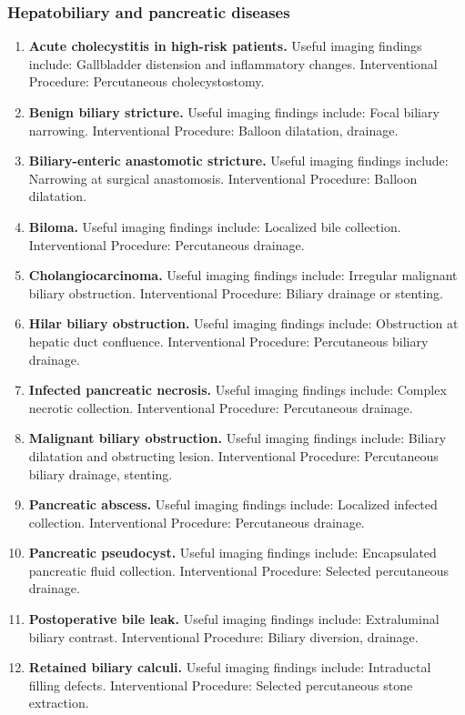 \subsubsection{Hepatobiliary and pancreatic diseases}
\begin{enumerate}[leftmargin=*,itemsep=0.45em,topsep=0.4em]
\item \textbf{Acute cholecystitis in high-risk patients.} Useful imaging findings include: Gallbladder distension and inflammatory changes. Interventional Procedure: Percutaneous cholecystostomy.
\item \textbf{Benign biliary stricture.} Useful imaging findings include: Focal biliary narrowing. Interventional Procedure: Balloon dilatation, drainage.
\item \textbf{Biliary-enteric anastomotic stricture.} Useful imaging findings include: Narrowing at surgical anastomosis. Interventional Procedure: Balloon dilatation.
\item \textbf{Biloma.} Useful imaging findings include: Localized bile collection. Interventional Procedure: Percutaneous drainage.
\item \textbf{Cholangiocarcinoma.} Useful imaging findings include: Irregular malignant biliary obstruction. Interventional Procedure: Biliary drainage or stenting.
\item \textbf{Hilar biliary obstruction.} Useful imaging findings include: Obstruction at hepatic duct confluence. Interventional Procedure: Percutaneous biliary drainage.
\item \textbf{Infected pancreatic necrosis.} Useful imaging findings include: Complex necrotic collection. Interventional Procedure: Percutaneous drainage.
\item \textbf{Malignant biliary obstruction.} Useful imaging findings include: Biliary dilatation and obstructing lesion. Interventional Procedure: Percutaneous biliary drainage, stenting.
\item \textbf{Pancreatic abscess.} Useful imaging findings include: Localized infected collection. Interventional Procedure: Percutaneous drainage.
\item \textbf{Pancreatic pseudocyst.} Useful imaging findings include: Encapsulated pancreatic fluid collection. Interventional Procedure: Selected percutaneous drainage.
\item \textbf{Postoperative bile leak.} Useful imaging findings include: Extraluminal biliary contrast. Interventional Procedure: Biliary diversion, drainage.
\item \textbf{Retained biliary calculi.} Useful imaging findings include: Intraductal filling defects. Interventional Procedure: Selected percutaneous stone extraction.
\end{enumerate}


